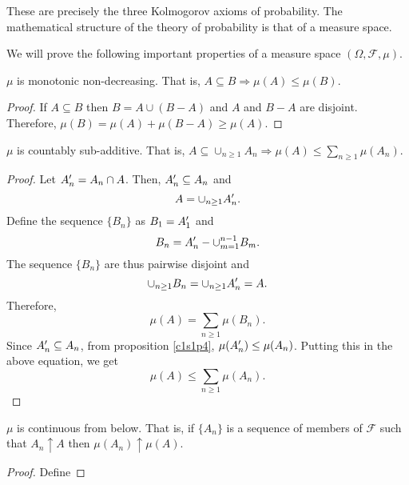 These are precisely the three Kolmogorov axioms of probability. The mathematical
structure of the theory of probability is that of a measure space.

We will prove the following important properties of a measure space $(\Omega,
\mathcal{F}, \mu)$.
\begin{prop}\label{c1s1p4}
$\mu$ is monotonic non-decreasing. That is, $A \subseteq B \Rightarrow \mu(A)
\le \mu(B)$.
\end{prop}
\begin{proof}
If $A \subseteq B$ then $B = A \cup (B - A)$ and $A$ and $B - A$ are disjoint.
Therefore, $\mu(B) = \mu(A) + \mu(B - A) \ge \mu(A)$.
\end{proof}

\begin{prop}\label{c1s1p5}
$\mu$ is countably sub-additive. That is, $A \subseteq \cup_{n \ge 1}A_n
\Rightarrow \mu(A) \le \sum_{n \ge 1}\mu(A_n)$.
\end{prop}
\begin{proof}
Let $A_n^\prime = A_n \cap A$. Then, $A_n^\prime \subseteq A_n$ and
\[
A = \cup_{n \ge 1}A_n^\prime.
\]
Define the sequence $\{B_n\}$ as $B_1 = A_1^\prime$
and 
\[
B_n = A_n^\prime - \cup_{m=1}^{n-1}B_m.
\]
The sequence $\{B_n\}$ are thus pairwise disjoint and
\[
\cup_{n \ge 1}B_n = \cup_{n \ge 1}A_n^\prime = A.
\]
Therefore,
\[
\mu(A) = \sum_{n \ge 1}\mu(B_n).
\]
Since $A_n^\prime \subseteq A_n$, from proposition \ref{c1s1p4}, $\mu(A_n^\prime)
\le \mu(A_n)$. Putting this in the above equation, we get
\[
\mu(A) \le \sum_{n \ge 1}\mu(A_n).
\]
\end{proof}

\begin{prop}\label{c1s1p6}
$\mu$ is continuous from below. That is, if $\{A_n\}$ is a sequence of members
of $\mathcal{F}$ such that $A_n \uparrow A$ then $\mu(A_n) \uparrow \mu(A)$.
\end{prop}
\begin{proof}
Define
\end{proof}


